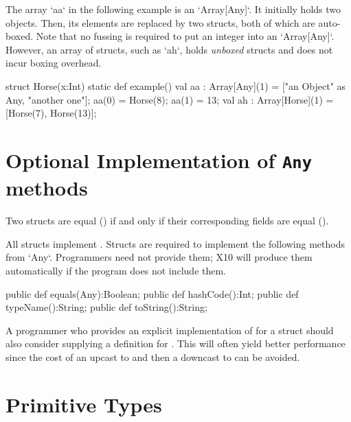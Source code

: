 \begin{ex}
The array \xcd`aa` in the following example is an \xcd`Array[Any]`.  It
initially holds two objects.  Then, its elements are replaced by two structs,
both of which are auto-boxed.  Note that no fussing is required to put an
integer into an \xcd`Array[Any]`.  
However, an array of structs, such as \xcd`ah`, holds {\em unboxed} structs
and does not incur boxing overhead.
\begin{xten}
struct Horse(x:Int){
  static def example(){
    val aa : Array[Any](1) = ["an Object" as Any, "another one"];
    aa(0) = Horse(8);
    aa(1) = 13;
    val ah : Array[Horse](1) = [Horse(7), Horse(13)];
  }
}
\end{xten}
%


\end{ex}

\section{Optional Implementation of {\tt Any} methods}
\label{StructAnyMethods}

Two
structs are equal (\Xcd{==}) if and only if their corresponding fields
are equal (\Xcd{==}). 

All structs implement . 
Structs are required to implement the following methods from \xcd`Any`.  
Programmers need not provide them; X10 will produce them automatically if 
the program does not include them. 
\begin{xten}
  public def equals(Any):Boolean;
  public def hashCode():Int;
  public def typeName():String;
  public def toString():String;  
\end{xten}


A programmer who provides an explicit implementation
of  for a struct  should also consider
supplying a definition for . This will often
yield better performance since the cost of an upcast to  and
then a downcast to  can be avoided.

\section{Primitive Types}

